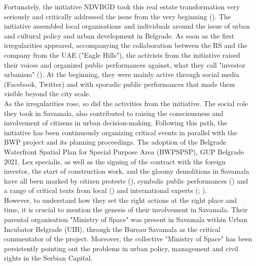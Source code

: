 \documentclass[11pt]{report}
\begin{document}
Fortunately, the initiative NDVBGD took this real estate transformation very seriously and critically addressed the issue from the very beginning (\cite{NeDa(vi)moBeograd}). %
The initiative assembled local organisations and individuals around the issue of urban and cultural policy and urban development in Belgrade. As soon as the first irregularities appeared, accompanying the collaboration between the RS and the company from the UAE ("Eagle Hills"), the activists from the initiative raised their voices and organized public performances against, what they call "investor urbanism" (\cite{SlobodnaEvropa2014}).%
 At the beginning, they were mainly active through social media (Facebook, Twitter) and with sporadic public performances that made them visible beyond the city scale.
\\

As the irregularities rose, so did the activities from the initiative. The social role they took in Savamala, also contributed to raising the consciousness and involvement of citizens in urban decision-making. Following this path, the initiative has been continuously organizing critical events in parallel with the BWP project and its planning proceedings. The adoption of the Belgrade Waterfront Spatial Plan for Special Purpose Area (BWPSPSP), GUP Belgrade 2021, Lex specialis, as well as the signing of the contract with the foreign investor, the start of construction work, and the gloomy demolitions in Savamala have all been marked by citizen protests (\cite{ko stoji iza gradjanskih prostora}), symbolic public performances (\cite{zuta patka ispred skupstine}) and a range of critical texts from local (\href{Petovar}{\citealt{petovar_princip_2014}}) and international experts (\href{Spectacle}{\citealt{the_spectacle_blog_inura_2014}}; \href{ref}{\citealt{krusche_bureau_2015}}).
\\

However, to  understand how they set the right actions at the right place and time, it is crucial to mention the genesis of their involvement in Savamala. Their parental organisation "Ministry of Space" was present in Savamala within Urban Incubator Belgrade (UIB), through the Bureau Savamala as the critical commentator of the project. Moreover, the collective "Ministry of Space" has been persistently pointing out the problems in urban policy, management and civil rights in the Serbian Capital.
\\
\end{document}
